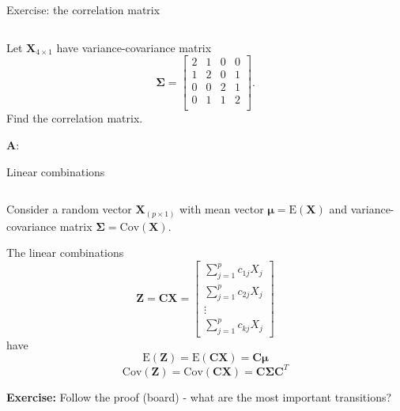 \documentclass[ignorenonframetext,]{beamer}
\begin{document}
\begin{frame}

\begin{block}{Exercise: the correlation matrix}

\(~\)

Let \(\boldsymbol{X}_{4\times 1}\) have variance-covariance matrix
\[\boldsymbol\Sigma= \left[ \begin{array}{cccc} 2&1&0&0\\
      1&2&0&1\\
      0&0&2&1\\
      0&1&1&2\\
          \end{array}
          \right].\] Find the correlation matrix.

\end{block}

\end{frame}

\begin{frame}

\textbf{A}:

\end{frame}

\begin{frame}

\begin{block}{Linear combinations}

\(~\)

Consider a random vector \(\boldsymbol{X}_{(p\times 1)}\) with mean
vector \(\boldsymbol{\mu}=\text{E}(\boldsymbol{X})\) and
variance-covariance matrix
\(\boldsymbol\Sigma=\text{Cov}(\boldsymbol{X})\).

The linear combinations
\[\boldsymbol{Z}=\boldsymbol{C}\boldsymbol{X}=\left[ \begin{array}{c} \sum_{j=1}^p c_{1j}X_j\\ \sum_{j=1}^p c_{2j}X_j\\ \vdots \\ \sum_{j=1}^p c_{kj}X_j \end{array} \right]\]
have
\[\text{E}(\boldsymbol{Z})=\text{E}(\boldsymbol{C}\boldsymbol{X})=\boldsymbol{C}\boldsymbol{\mu}\]
\[\text{Cov}(\boldsymbol{Z})=\text{Cov}(\boldsymbol{C}\boldsymbol{X})=
   \boldsymbol{C}\boldsymbol\Sigma\boldsymbol{C}^T\]

\textbf{Exercise:} Follow the proof (board) - what are the most
important transitions?

\end{block}

\end{frame}
\end{document}
